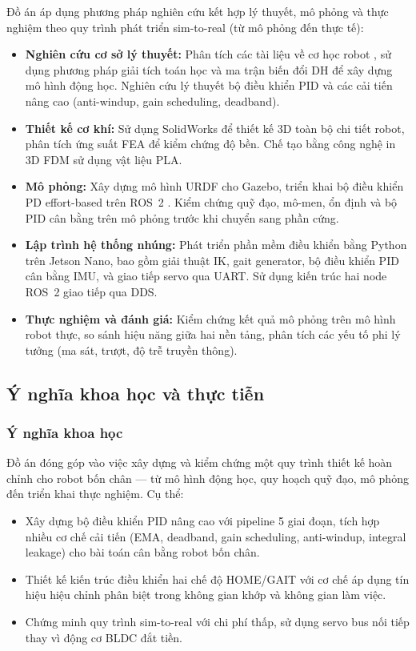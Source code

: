 Đồ án áp dụng phương pháp nghiên cứu kết hợp lý thuyết, mô phỏng và thực nghiệm theo quy trình phát triển sim-to-real (từ mô phỏng đến thực tế):

\begin{itemize}
    \item \textbf{Nghiên cứu cơ sở lý thuyết:} Phân tích các tài liệu về cơ học robot \cite{siciliano2009, craig2005, spong2020}, sử dụng phương pháp giải tích toán học và ma trận biến đổi DH để xây dựng mô hình động học. Nghiên cứu lý thuyết bộ điều khiển PID và các cải tiến nâng cao (anti-windup, gain scheduling, deadband).

    \item \textbf{Thiết kế cơ khí:} Sử dụng SolidWorks để thiết kế 3D toàn bộ chi tiết robot, phân tích ứng suất FEA để kiểm chứng độ bền. Chế tạo bằng công nghệ in 3D FDM sử dụng vật liệu PLA.

    \item \textbf{Mô phỏng:} Xây dựng mô hình URDF cho Gazebo, triển khai bộ điều khiển PD effort-based trên ROS~2 \cite{ros2docs, gazebo}. Kiểm chứng quỹ đạo, mô-men, ổn định và bộ PID cân bằng trên mô phỏng trước khi chuyển sang phần cứng.

    \item \textbf{Lập trình hệ thống nhúng:} Phát triển phần mềm điều khiển bằng Python trên Jetson Nano, bao gồm giải thuật IK, gait generator, bộ điều khiển PID cân bằng IMU, và giao tiếp servo qua UART. Sử dụng kiến trúc hai node ROS~2 giao tiếp qua DDS.

    \item \textbf{Thực nghiệm và đánh giá:} Kiểm chứng kết quả mô phỏng trên mô hình robot thực, so sánh hiệu năng giữa hai nền tảng, phân tích các yếu tố phi lý tưởng (ma sát, trượt, độ trễ truyền thông).
\end{itemize}

\subsection{Ý nghĩa khoa học và thực tiễn}

\subsubsection{Ý nghĩa khoa học}
Đồ án đóng góp vào việc xây dựng và kiểm chứng một quy trình thiết kế hoàn chỉnh cho robot bốn chân --- từ mô hình động học, quy hoạch quỹ đạo, mô phỏng đến triển khai thực nghiệm. Cụ thể:

\begin{itemize}
    \item Xây dựng bộ điều khiển PID nâng cao với pipeline 5 giai đoạn, tích hợp nhiều cơ chế cải tiến (EMA, deadband, gain scheduling, anti-windup, integral leakage) cho bài toán cân bằng robot bốn chân.
    \item Thiết kế kiến trúc điều khiển hai chế độ HOME/GAIT với cơ chế áp dụng tín hiệu hiệu chỉnh phân biệt trong không gian khớp và không gian làm việc.
    \item Chứng minh quy trình sim-to-real với chi phí thấp, sử dụng servo bus nối tiếp thay vì động cơ BLDC đắt tiền.
\end{itemize}

